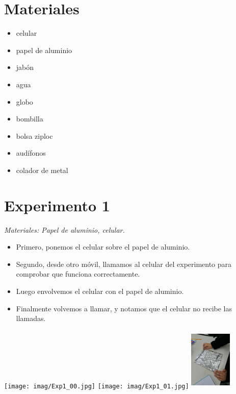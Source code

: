 \documentclass[]{article}
\newenvironment{Figura}
  {\par\medskip\noindent\minipage{\linewidth}}
  {\endminipage\par\medskip}
\begin{document}
\begin{multicols*}{2}



\section*{Materiales}

\begin{multicols*}{2}
\begin{itemize}
    \item celular
    \item papel de aluminio
    \item jabón
    \item agua
    \item globo
    \item bombilla
    \item bolsa ziploc
    \item audífonos
    \item colador de metal 
\end{itemize}
\end{multicols*}




\section*{Experimento 1}
\textit{Materiales: Papel de aluminio, celular.}

\vspace{-\topsep}
\begin{itemize}
    \setlength{\parskip}{0pt} 
    \setlength{\itemsep}{0pt plus 1pt}
    \item Primero, ponemos el celular sobre el papel de aluminio.
    \item Segundo, desde otro móvil, llamamos al celular del experimento para comprobar que funciona correctamente.
    \item Luego envolvemos el celular con el papel de aluminio.
    \item Finalmente volvemos a llamar, y notamos que el celular no recibe las llamadas.
\end{itemize}
\vspace{-\topsep}


\begin{Figura}
    \centering
    \texttt{[image: imag/Exp1\_00.jpg]}
    \texttt{[image: imag/Exp1\_01.jpg]}
    \includegraphics[width=2cm, height=3cm]{imag/Exp1_02.jpg}
\end{Figura}


\end{multicols*}
\end{document}
